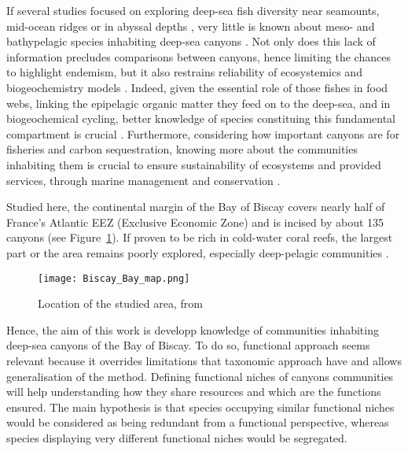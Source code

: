 
If several studies focused on exploring deep-sea fish diversity near seamounts, mid-ocean ridges or in abyssal depths \citep{cook2013,sutton2013}, very little is known about meso- and bathypelagic species inhabiting deep-sea canyons \citep{kenchington2020}. Not only does this lack of information precludes comparisons between canyons, hence limiting the chances to highlight endemism, but it also restrains reliability of ecosystemics and biogeochemistry models \citep{davison2015,kenchington2020}. Indeed, given the essential role of those fishes in food webs, linking the epipelagic organic matter they feed on to the deep-sea, and in biogeochemical cycling, better knowledge of species constituing this fundamental compartment is crucial \citep{davison2015,gaskett2001}. Furthermore, considering how important canyons are for fisheries and carbon sequestration, knowing more about the communities inhabiting them is crucial to ensure sustainability of ecosystems and provided services, through marine management and conservation \citep{fernandez-arcaya2017,vandenbeld2017a}.

Studied here, the continental margin of the Bay of Biscay covers nearly half of France's Atlantic EEZ (Exclusive Economic Zone) and is incised by about 135 canyons \citep{bourillet2006,spitz2019,vandenbeld2017} (see Figure~\ref{fig:bbm}). If proven to be rich in cold-water coral reefs, the largest part or the area remains poorly explored, especially deep-pelagic communities \citep{garcia2021,vandenbeld2017a,webb2010}.

\begin{figure} [!htbp]
	\begin{center}
		\texttt{[image: Biscay\_Bay\_map.png]}
	\end{center}
	\caption[Petite légende]{Location of the studied area, from \citep{mulder2012}}
	\label{fig:bbm}
\end{figure}

Hence, the aim of this work is developp knowledge of communities inhabiting deep-sea canyons of the Bay of Biscay. To do so, functional approach seems relevant because it overrides limitations that taxonomic approach have and allows generalisation of the method. Defining functional niches of canyons communities will help understanding how they share resources and which are the functions ensured. The main hypothesis is that species occupying similar functional niches would be considered as being redundant from a functional perspective, whereas species displaying very different functional niches would be segregated. 

